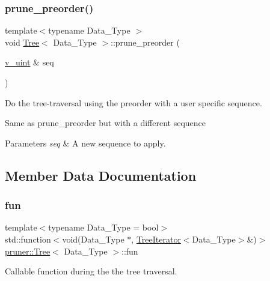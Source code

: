 \subsubsection{\texorpdfstring{prune\+\_\+preorder()}{prune\_preorder()}\hspace{0.1cm}{\footnotesize\ttfamily [2/2]}}
{\footnotesize\ttfamily template$<$typename Data\+\_\+\+Type $>$ \\
void \hyperlink{classpruner_1_1Tree}{Tree}$<$ Data\+\_\+\+Type $>$\+::prune\+\_\+preorder (\begin{DoxyParamCaption}\item[{\hyperlink{namespacepruner_af0145646bd7ede012cd336b416bc5579}{v\+\_\+uint} \&}]{seq }\end{DoxyParamCaption})\hspace{0.3cm}{\ttfamily [inline]}}



Do the tree-\/traversal using the preorder with a user specific sequence. 

Same as {\ttfamily prune\+\_\+preorder} but with a different sequence 
\begin{DoxyParams}{Parameters}
{\em seq} & A new sequence to apply. \\
\hline
\end{DoxyParams}


\subsection{Member Data Documentation}
\mbox{\label{classpruner_1_1Tree_adc2f509b8bf17ba16364632c17870c87}} 
\subsubsection{\texorpdfstring{fun}{fun}}
{\footnotesize\ttfamily template$<$typename Data\+\_\+\+Type = bool$>$ \\
std\+::function$<$void(Data\+\_\+\+Type $\ast$, \hyperlink{classpruner_1_1TreeIterator}{Tree\+Iterator}$<$Data\+\_\+\+Type$>$\&)$>$ \hyperlink{classpruner_1_1Tree}{pruner\+::\+Tree}$<$ Data\+\_\+\+Type $>$\+::fun}



Callable function during the the tree traversal. 

